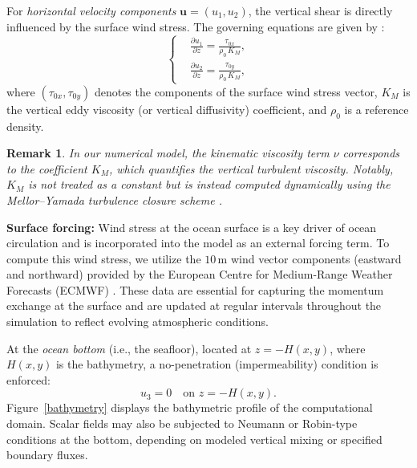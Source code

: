 \documentclass[a4paper,12pt,reqno,natbib]{amsart}
\newtheorem{remark}[theorem]{Remark}
\begin{document}
\medskip

\noindent For \emph{horizontal velocity components} \( \mathbf{u} = (u_1, u_2) \), the vertical shear is directly influenced by the surface wind stress. The governing equations are given by \cite{mellor87}:
\begin{equation*}
\left\{
\begin{aligned}
& \frac{\partial u_1}{\partial z} = \frac{\tau_{0x}}{\rho_0 \, {K}_M}, \\
& \frac{\partial u_2}{\partial z} = \frac{\tau_{0y}}{\rho_0 \,  {K}_M},
\end{aligned}
\right.
\end{equation*}
where \( (\tau_{0x}, \tau_{0y}) \) denotes the components of the surface wind stress vector, \(  {K}_M \) is the vertical eddy viscosity (or vertical diffusivity) coefficient, and \( \rho_0 \) is a reference density. 

\begin{remark}
    In our numerical model, the kinematic viscosity term \( \nu \) corresponds to the coefficient \( K_M \), which quantifies the vertical turbulent viscosity. Notably, \( K_M \) is not treated as a constant but is instead computed dynamically using the Mellor–Yamada turbulence closure scheme \cite{mellor82}.
\end{remark}



\vspace{0.3cm}

\noindent\textbf{Surface forcing:} Wind stress at the ocean surface is a key driver of ocean circulation and is incorporated into the model as an external forcing term. To compute this wind stress, we utilize the $10\,\text{m}$ wind vector components (eastward and northward) provided by the European Centre for Medium-Range Weather Forecasts (ECMWF) \cite{owens2018ecmwf}. These data are essential for capturing the momentum exchange at the surface and are updated at regular intervals throughout the simulation to reflect evolving atmospheric conditions.


\medskip

\noindent At the \emph{ocean bottom} (i.e., the seafloor), located at \( z = -H(x, y) \), where \( H(x, y) \) is the bathymetry, a no-penetration (impermeability) condition is enforced:
\[
u_3 = 0 \quad \text{on } z = -H(x, y).
\]
Figure~\ref{bathymetry} displays the bathymetric profile of the computational domain. Scalar fields may also be subjected to Neumann or Robin-type conditions at the bottom, depending on modeled vertical mixing or specified boundary fluxes.
\end{document}
